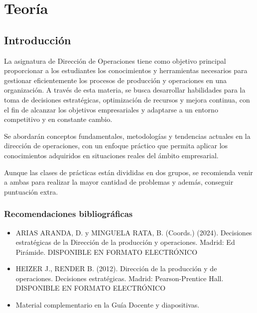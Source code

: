 \documentclass[12pt]{report} %
\providecommand{\tightlist}{%
  \setlength{\itemsep}{0pt}\setlength{\parskip}{0pt}}
\begin{document}
\part{Teoría}

\hypertarget{introducciuxf3n}{%
\chapter{Introducción}\label{introducciuxf3n}}

La asignatura de Dirección de Operaciones tiene como objetivo principal
proporcionar a los estudiantes los conocimientos y herramientas
necesarios para gestionar eficientemente los procesos de producción y
operaciones en una organización. A través de esta materia, se busca
desarrollar habilidades para la toma de decisiones estratégicas,
optimización de recursos y mejora continua, con el fin de alcanzar los
objetivos empresariales y adaptarse a un entorno competitivo y en
constante cambio.

Se abordarán conceptos fundamentales, metodologías y tendencias actuales
en la dirección de operaciones, con un enfoque práctico que permita
aplicar los conocimientos adquiridos en situaciones reales del ámbito
empresarial.

Aunque las clases de prácticas están divididas en dos grupos, se
recomienda venir a ambas para realizar la mayor cantidad de problemas y
además, conseguir puntuación extra.

\hypertarget{recomendaciones-bibliogruxe1ficas}{%
\section{Recomendaciones
bibliográficas}\label{recomendaciones-bibliogruxe1ficas}}

\begin{itemize}
\tightlist
\item
  ARIAS ARANDA, D. y MINGUELA RATA, B. (Coords.) (2024). Decisiones
  estratégicas de la Dirección de la producción y operaciones. Madrid:
  Ed Pirámide. DISPONIBLE EN FORMATO ELECTRÓNICO\\
\item
  HEIZER J., RENDER B. (2012). Dirección de la producción y de
  operaciones. Decisiones estratégicas. Madrid: Pearson-Prentice Hall.
  DISPONIBLE EN FORMATO ELECTRÓNICO\\
\item
  Material complementario en la Guía Docente y diapositivas.
\end{itemize}
\end{document}

